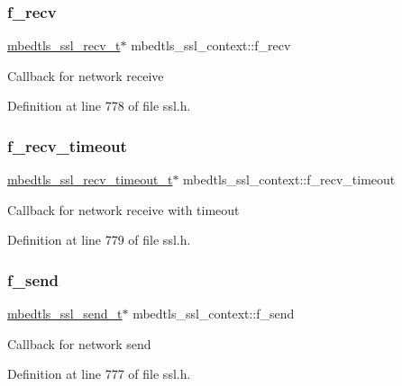 \subsubsection{\texorpdfstring{f\+\_\+recv}{f\_recv}}
{\footnotesize\ttfamily \mbox{\hyperlink{ssl_8h_ac06b19b96b643090c55f19b6c28b10c4}{mbedtls\+\_\+ssl\+\_\+recv\+\_\+t}}$\ast$ mbedtls\+\_\+ssl\+\_\+context\+::f\+\_\+recv}

Callback for network receive 

Definition at line 778 of file ssl.\+h.

\mbox{\label{structmbedtls__ssl__context_ab73e4b497e3ed88b3bebad3bada2758b}} 
\subsubsection{\texorpdfstring{f\+\_\+recv\+\_\+timeout}{f\_recv\_timeout}}
{\footnotesize\ttfamily \mbox{\hyperlink{ssl_8h_a6d615ca95c8a67d7c5f9d7d256dc09e6}{mbedtls\+\_\+ssl\+\_\+recv\+\_\+timeout\+\_\+t}}$\ast$ mbedtls\+\_\+ssl\+\_\+context\+::f\+\_\+recv\+\_\+timeout}

Callback for network receive with timeout 

Definition at line 779 of file ssl.\+h.

\mbox{\label{structmbedtls__ssl__context_a56c031134adcd848c5fbdab961fe263d}} 
\subsubsection{\texorpdfstring{f\+\_\+send}{f\_send}}
{\footnotesize\ttfamily \mbox{\hyperlink{ssl_8h_a38e2b400d361f42f85833cdc30b3916e}{mbedtls\+\_\+ssl\+\_\+send\+\_\+t}}$\ast$ mbedtls\+\_\+ssl\+\_\+context\+::f\+\_\+send}

Callback for network send 

Definition at line 777 of file ssl.\+h.

\mbox{\label{structmbedtls__ssl__context_a1dd74017666428c62af5e05e46f0f8f1}} 
